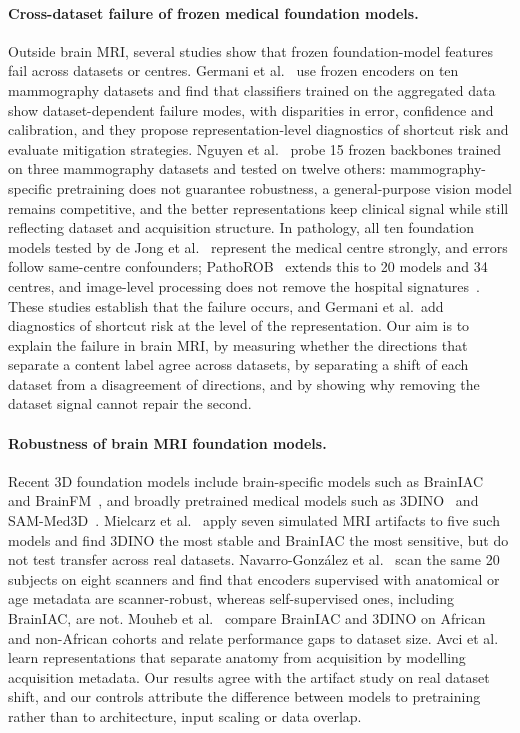 \documentclass[11pt]{article}
\begin{document}
\paragraph{Cross-dataset failure of frozen medical foundation models.}
Outside brain MRI, several studies show that frozen foundation-model features
fail across datasets or centres. Germani et
al.~\cite{germani_multi-institutional_2026} use frozen encoders on ten
mammography datasets and find that classifiers trained on the aggregated data
show dataset-dependent failure modes, with disparities in error, confidence
and calibration, and they propose representation-level diagnostics of
shortcut risk and evaluate mitigation strategies. Nguyen et
al.~\cite{nguyen_benchmarking_2026} probe 15 frozen backbones trained on three
mammography datasets and tested on twelve others: mammography-specific
pretraining does not guarantee robustness, a general-purpose vision model
remains competitive, and the better representations keep clinical signal while
still reflecting dataset and acquisition structure. In pathology, all ten
foundation models tested by de Jong et al.~\cite{de_jong_current_2025}
represent the medical centre strongly, and errors follow same-centre
confounders; PathoROB~\cite{komen_towards_2025} extends this to 20 models and
34 centres, and image-level processing does not remove the hospital
signatures~\cite{komen_histopathological_2024}. These studies establish that
the failure occurs, and Germani et al.\ add diagnostics of shortcut risk at
the level of the representation. Our aim is to explain the failure in brain
MRI, by measuring whether the directions that separate a content label
agree across datasets, by separating a shift of each dataset from a
disagreement of directions, and by showing why removing the dataset signal
cannot repair the second.

\paragraph{Robustness of brain MRI foundation models.}
Recent 3D foundation models include brain-specific models such as
BrainIAC~\cite{tak_generalizable_2026} and
BrainFM~\cite{liu_modality-agnostic_2025}, and broadly pretrained medical
models such as 3DINO~\cite{xu_generalizable_2025} and
SAM-Med3D~\cite{wang_sam-med3d_2025}. Mielcarz et al.~\cite{mielcarz_3d_2026}
apply seven simulated MRI artifacts to five such models and find 3DINO the
most stable and BrainIAC the most sensitive, but do not test transfer across
real datasets. Navarro-Gonz\'alez et
al.~\cite{navarro-gonzalez_cross-scanner_2026} scan the same 20 subjects on
eight scanners and find that encoders supervised with anatomical or age
metadata are scanner-robust, whereas self-supervised ones, including BrainIAC,
are not. Mouheb et al.~\cite{mouheb_medical_2026} compare BrainIAC and 3DINO
on African and non-African cohorts and relate performance gaps to dataset
size. Avci et al.~\cite{avci_metadata_2026} learn representations that
separate anatomy from acquisition by modelling acquisition metadata. Our
results agree with the artifact study on real dataset shift, and our
controls attribute the difference between models to pretraining rather than
to architecture, input scaling or data overlap.
\end{document}
